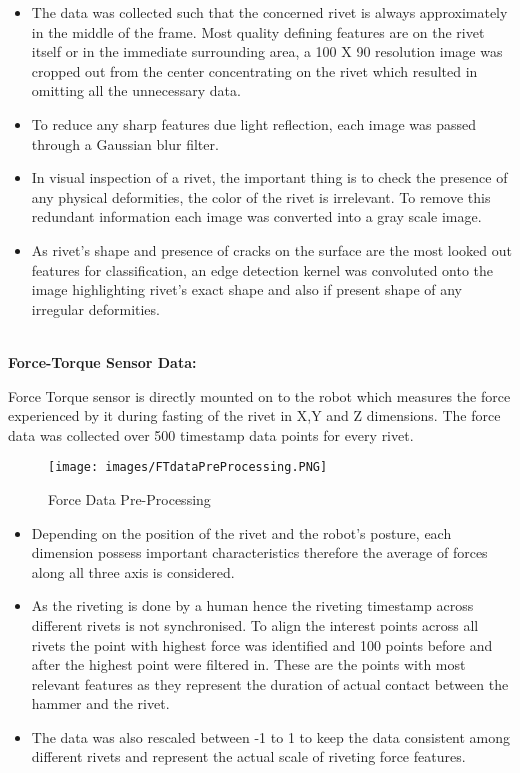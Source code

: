 \documentclass{article}
\begin{document}
 \begin{itemize}
     \item The data was collected such that the concerned rivet is always approximately in the middle of the frame. Most quality defining features are on the rivet itself or in the immediate surrounding area, a 100 X 90 resolution image was cropped out from the center concentrating on the rivet which resulted in omitting all the unnecessary data.
     
     \item To reduce any sharp features due light reflection, each image was passed through a Gaussian blur filter.
     
     \item In visual inspection of a rivet, the important thing is to check the presence of any physical deformities, the color of the rivet is irrelevant. To remove this redundant information each image was converted into a gray scale image.  
     
     \item As rivet's shape and presence of cracks on the surface are the most looked out features for classification, an edge detection kernel was convoluted onto the image highlighting rivet's exact shape and also if present shape of any irregular deformities.  
     
    \end{itemize}



\\\textbf{Force-Torque Sensor Data: }
    
Force Torque sensor is directly mounted on to the robot which measures the force experienced by it during fasting of the rivet in X,Y and Z dimensions. The force data was collected over 500 timestamp data points for every rivet.



\begin{figure}[H]
    \centering
    \texttt{[image: images/FTdataPreProcessing.PNG]}
    \caption{Force Data Pre-Processing}
    \label{fig: FtDAtaPreProcessing}
\end{figure}

\begin{itemize}
    \item Depending on the position of the rivet and the robot’s posture, each dimension possess important characteristics therefore the average of forces along all three axis is considered.
    
    \item As the riveting is done by a human hence the riveting timestamp across different rivets is not synchronised. To align the interest  points across all rivets the point with highest force was identified and 100 points before and after the highest point were filtered in. These are the points with most relevant features as they represent the duration of actual contact between the hammer and the  rivet.
    \item The data was also rescaled between -1 to 1 to keep the data consistent among different rivets and represent the actual scale of riveting force features.
\end{itemize}
\end{document}
